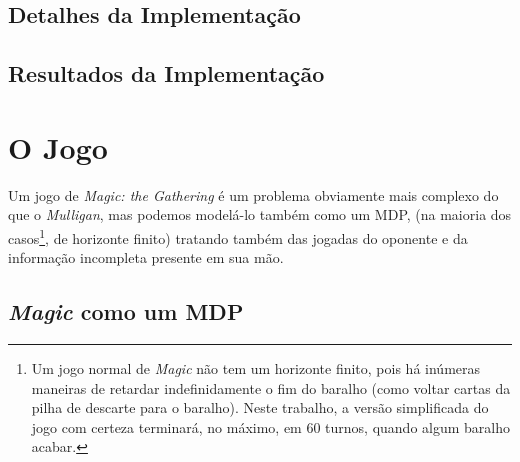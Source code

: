 \documentclass[dvipsnames]{book}
\begin{document}
\subsection{Detalhes da Implementação}

\subsection{Resultados da Implementação}
\pagebreak

\section{O Jogo}

Um jogo de \textit{Magic: the Gathering} é um problema obviamente mais complexo do que o \textit{Mulligan}, mas podemos modelá-lo também como um MDP,
(na maioria dos casos\footnote{Um jogo normal de \textit{Magic} não tem um horizonte finito, pois há
inúmeras maneiras de retardar indefinidamente o fim do baralho (como voltar cartas da pilha de descarte para o baralho). Neste trabalho, a versão
simplificada do jogo com certeza terminará, no máximo, em 60 turnos, quando algum baralho acabar.}, de horizonte finito) tratando também das jogadas do oponente e da informação incompleta presente em sua mão.

\subsection{\textit{Magic} como um MDP}
\end{document}
